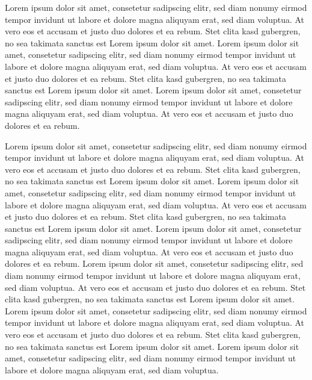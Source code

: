 \documentclass[preprint,journal]{vgtc}       %
\begin{document}
Lorem ipsum dolor sit amet, consetetur sadipscing elitr, sed diam
nonumy eirmod tempor invidunt ut labore et dolore magna aliquyam erat,
sed diam voluptua. At vero eos et accusam et justo duo dolores et ea
rebum. Stet clita kasd gubergren, no sea takimata sanctus est Lorem
ipsum dolor sit amet. Lorem ipsum dolor sit amet, consetetur
sadipscing elitr, sed diam nonumy eirmod tempor invidunt ut labore et
dolore magna aliquyam erat, sed diam voluptua. At vero eos et accusam
et justo duo dolores et ea rebum. Stet clita kasd gubergren, no sea
takimata sanctus est Lorem ipsum dolor sit amet. Lorem ipsum dolor sit
amet, consetetur sadipscing elitr, sed diam nonumy eirmod tempor
invidunt ut labore et dolore magna aliquyam erat, sed diam
voluptua. At vero eos et accusam et justo duo dolores et ea
rebum.

Lorem ipsum dolor sit amet, consetetur sadipscing elitr, sed diam
nonumy eirmod tempor invidunt ut labore et dolore magna aliquyam erat,
sed diam voluptua. At vero eos et accusam et justo duo dolores et ea
rebum. Stet clita kasd gubergren, no sea takimata sanctus est Lorem
ipsum dolor sit amet. Lorem ipsum dolor sit amet, consetetur
sadipscing elitr, sed diam nonumy eirmod tempor invidunt ut labore et
dolore magna aliquyam erat, sed diam voluptua. At vero eos et accusam
et justo duo dolores et ea rebum. Stet clita kasd gubergren, no sea
takimata sanctus est Lorem ipsum dolor sit amet. Lorem ipsum dolor sit
amet, consetetur sadipscing elitr, sed diam nonumy eirmod tempor
invidunt ut labore et dolore magna aliquyam erat, sed diam
voluptua. At vero eos et accusam et justo duo dolores et ea
rebum.
Lorem ipsum dolor sit amet, consetetur sadipscing elitr, sed diam
nonumy eirmod tempor invidunt ut labore et dolore magna aliquyam erat,
sed diam voluptua. At vero eos et accusam et justo duo dolores et ea
rebum. Stet clita kasd gubergren, no sea takimata sanctus est Lorem
ipsum dolor sit amet. Lorem ipsum dolor sit amet, consetetur
sadipscing elitr, sed diam nonumy eirmod tempor invidunt ut labore et
dolore magna aliquyam erat, sed diam voluptua. At vero eos et accusam
et justo duo dolores et ea rebum. Stet clita kasd gubergren, no sea
takimata sanctus est Lorem ipsum dolor sit amet. Lorem ipsum dolor sit
amet, consetetur sadipscing elitr, sed diam nonumy eirmod tempor
invidunt ut labore et dolore magna aliquyam erat, sed diam
voluptua. 
\end{document}
